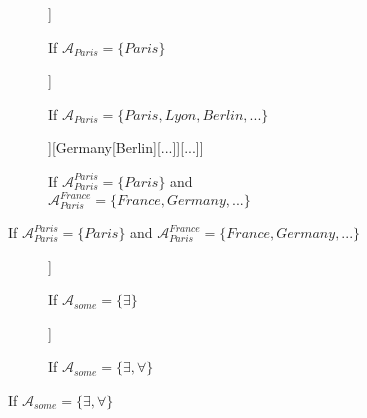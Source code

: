 \begin{figure}[H]
	\centering
	\begin{subfigure}[b]{.2\linewidth}
		\centering
		\begin{forest}
			[CS[Paris][$\neg$Paris]]
		\end{forest}
		\caption{If $\mathcal{A}_{\textit{Paris}} = \lbrace \textit{Paris}\rbrace$}
	\end{subfigure}
	\hfill
	\begin{subfigure}[b]{.3\linewidth}
		\centering
		\begin{forest}
			[CS[Paris][Lyon][Berlin][...]]
		\end{forest}
		\caption{If $\mathcal{A}_{\textit{Paris}} = \lbrace \textit{Paris}, \textit{Lyon}, \textit{Berlin}, ...\rbrace$}
	\end{subfigure}
	\hfill
	\begin{subfigure}[b]{.45\linewidth}
		\centering
		\begin{forest}
			[CS[France[Paris][Lyon][...]][Germany[Berlin][...]][...]]
		\end{forest}
		\caption{If $\mathcal{A}_{\textit{Paris}}^{\textit{Paris}} = \lbrace \textit{Paris}\rbrace$ and  $\mathcal{A}_{\textit{Paris}}^{\textit{France}} = \lbrace \textit{France}, \textit{Germany}, ...\rbrace$}
	\end{subfigure}
\end{figure}
\begin{figure}[H]
	\centering
	\begin{subfigure}[b]{.2\linewidth}
		\centering
		\begin{forest}
			[CS[$\exists$][$\neg\exists$]]
		\end{forest}
		\caption{If $\mathcal{A}_{\textit{some}} = \lbrace\exists\rbrace$}
	\end{subfigure}
	\hfill
	\begin{subfigure}[b]{.3\linewidth}
		\centering
		\begin{forest}
			[CS[$\neg\exists$][\sbna][$\forall$]]
		\end{forest}
		\caption{If $\mathcal{A}_{\textit{some}} = \lbrace \exists, \forall\rbrace$}
	\end{subfigure}
\end{figure}
